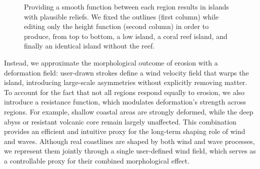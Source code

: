 \begin{figure}[tb]
    \caption[Curve-based generation of an island, varying the shape of the profile function]{Providing a smooth function between each region results in islands with plausible reliefs. We fixed the outlines (first column) while editing only the height function (second column) in order to produce, from top to bottom, a low island, a coral reef island, and finally an identical island without the reef.}
    \label{fig:coral-island-procedural-smooth-heights}
\end{figure}





Instead, we approximate the morphological outcome of erosion with a deformation field: user-drawn strokes define a wind velocity field that warps the island, introducing large-scale asymmetries without explicitly removing matter. To account for the fact that not all regions respond equally to erosion, we also introduce a resistance function, which modulates deformation's strength across regions. For example, shallow coastal areas are strongly deformed, while the deep abyss or resistant volcanic core remain largely unaffected. This combination provides an efficient and intuitive proxy for the long-term shaping role of wind and waves.
Although real coastlines are shaped by both wind and wave processes, we represent them jointly through a single user-defined wind field, which serves as a controllable proxy for their combined morphological effect.

